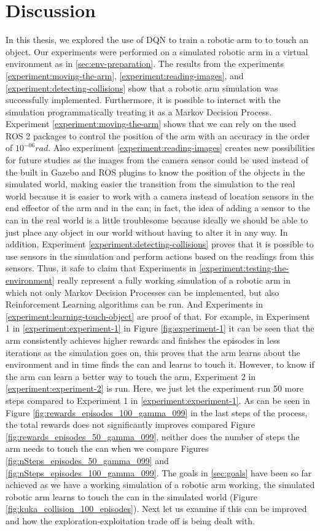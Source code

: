 \documentclass[12pt,oneside]{article}
\begin{document}
\section{Discussion}
In this thesis, we explored the use of DQN to train a robotic arm to to touch an object. Our experiments were performed on a simulated robotic arm in a virtual environment as in \ref{sec:env-preparation}.
The results from the experiments \ref{experiment:moving-the-arm}, \ref{experiment:reading-images}, and \ref{experiment:detecting-collisions} show that a robotic arm simulation was successfully implemented. Furthermore, it is possible to interact with the simulation programmatically treating it as a Markov Decision Process. Experiment \ref{experiment:moving-the-arm} shows that we can rely on the used ROS 2 packages to control the position of the arm with an accuracy in the order of $10^{-06} rad$.
Also experiment \ref{experiment:reading-images} creates new possibilities for future studies as the images from the camera sensor could be used instead of the built in Gazebo and ROS plugins to know the position of the objects in the simulated world, making easier the transition from the simulation to the real world because it is easier to work with a camera instead of location sensors in the end effector of the arm and in the can; in fact, the idea of adding a sensor to the can in the real world is a little troublesome because ideally we should be able to just place any object in our world without having to alter it in any way. 
In addition, Experiment \ref{experiment:detecting-collisions} proves that it is possible to use sensors in the simulation and perform actions based on the readings from this sensors. Thus, it safe to claim that Experiments in \ref{experiment:testing-the-environment} really represent a fully working simulation of a robotic arm in which not only Markov Decision Processes can be implemented, but also Reinforcement Learning algorithms can be run. And Experiments in \ref{experiment:learning-touch-object} are proof of that. For example, in Experiment 1 in \ref{experiment:experiment-1} in Figure \ref{fig:experiment-1} it can be seen that the arm consistently achieves higher rewards and finishes the episodes in less iterations as the simulation goes on, this proves that the arm learns about the environment and in time finds the can and learns to touch it. However, to know if the arm can learn a better way to touch the arm, Experiment 2 in \ref{experiment:experiment-2} is run. Here, we just let the experiment run 50 more steps compared to Experiment 1 in \ref{experiment:experiment-1}. As can be seen in Figure \ref{fig:rewards_episodes_100_gamma_099} in the last steps of the process, the total rewards does not significantly improves compared Figure \ref{fig:rewards_episodes_50_gamma_099}, neither does the number of steps the arm needs to touch the can when we compare Figures \ref{fig:nSteps_episodes_50_gamma_099} and \ref{fig:nSteps_episodes_100_gamma_099}. The goals in \ref{sec:goals} have been so far achieved as we have a working simulation of a robotic arm working, the simulated robotic arm learns to touch the can in the simulated world (Figure \ref{fig:kuka_collision_100_episodes}). Next let us examine if this can be improved and how the exploration-exploitation trade off is being dealt with. 
\end{document}
